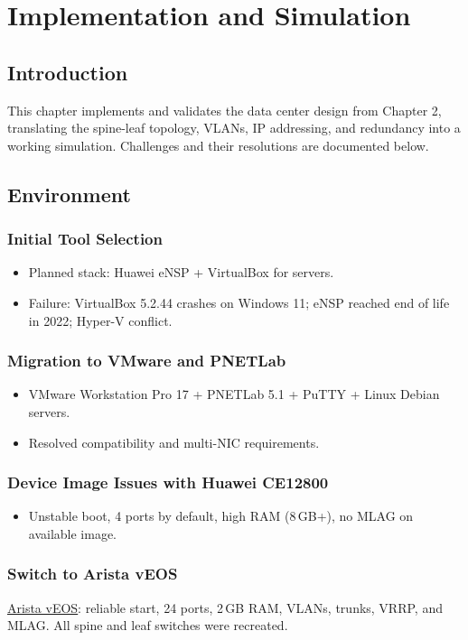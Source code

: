 \chapter{Implementation and Simulation}

\section{Introduction}
This chapter implements and validates the data center design from Chapter 2, translating the spine-leaf topology, VLANs, IP addressing, and redundancy into a working simulation. Challenges and their resolutions are documented below.
\section{Environment}
\subsection{Initial Tool Selection}
\begin{itemize}[nosep]
    \item Planned stack: Huawei eNSP\cite{ensp} + VirtualBox\cite{virtualbox} for servers.
    \item Failure: VirtualBox 5.2.44 crashes on Windows 11; eNSP reached end of life in 2022; Hyper-V conflict.
\end{itemize}
\subsection{Migration to VMware and PNETLab}
\begin{itemize}[nosep]
    \item VMware Workstation Pro 17\cite{vmware} + PNETLab 5.1\cite{pnetlab} + PuTTY\cite{putty} + Linux Debian servers.
    \item Resolved compatibility and multi-NIC requirements.
\end{itemize}
\subsection{Device Image Issues with Huawei CE12800}
\begin{itemize}[nosep]
    \item Unstable boot, 4 ports by default, high RAM (8\,GB+), no MLAG on available image.
\end{itemize}
\subsection{Switch to Arista vEOS}
\hyperref[def:veos]{\underline{Arista vEOS}}: reliable start, 24 ports, 2\,GB RAM, VLANs, trunks, VRRP, and MLAG. All spine and leaf switches were recreated.

